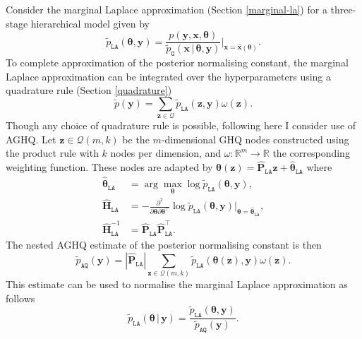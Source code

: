 \documentclass[a4paper, nobind]{templates/ociamthesis}
\begin{document}
Consider the marginal Laplace approximation (Section \ref{marginal-la}) for a three-stage hierarchical model given by
\begin{equation}
\tilde p_{\texttt{LA}}(\boldsymbol{\mathbf{\theta}}, \mathbf{y}) = \frac{p(\mathbf{y}, \mathbf{x}, \boldsymbol{\mathbf{\theta}})}{\tilde p_\texttt{G}(\mathbf{x} \, | \, \boldsymbol{\mathbf{\theta}}, \mathbf{y})} \Big\rvert_{\mathbf{x} = \hat{\mathbf{x}}(\boldsymbol{\mathbf{\theta}})}.
\end{equation}
To complete approximation of the posterior normalising constant, the marginal Laplace approximation can be integrated over the hyperparameters using a quadrature rule (Section \ref{quadrature})
\begin{equation}
\tilde p(\mathbf{y}) = \sum_{\mathbf{z} \in \mathcal{Q}} \tilde p_\texttt{LA}(\mathbf{z}, \mathbf{y}) \omega(\mathbf{z}). \label{eq:inlanormconst}
\end{equation}
Though any choice of quadrature rule is possible, following \textcite{stringer2022fast} here I consider use of AGHQ.
Let \(\mathbf{z} \in \mathcal{Q}(m, k)\) be the \(m\)-dimensional GHQ nodes constructed using the product rule with \(k\) nodes per dimension, and \(\omega: \mathbb{R}^m \to \mathbb{R}\) the corresponding weighting function.
These nodes are adapted by \(\boldsymbol{\mathbf{\theta}}(\mathbf{z}) = \hat{\mathbf{P}}_\texttt{LA} \mathbf{z} + \hat{\boldsymbol{\mathbf{\theta}}}_\texttt{LA}\) where
\begin{align}
\hat{\boldsymbol{\mathbf{\theta}}}_\texttt{LA} &= \arg\max_{\boldsymbol{\mathbf{\theta}}} \log \tilde p_{\texttt{LA}}(\boldsymbol{\mathbf{\theta}}, \mathbf{y}), \\
\hat{\boldsymbol{\mathbf{H}}}_\texttt{LA} &= - \frac{\partial^2}{\partial \boldsymbol{\mathbf{\theta}} \partial \boldsymbol{\mathbf{\theta}}^\top} \log \tilde p_{\texttt{LA}}(\boldsymbol{\mathbf{\theta}}, \mathbf{y}) \rvert_{\boldsymbol{\mathbf{\theta}} = \hat{\boldsymbol{\mathbf{\theta}}}_\texttt{LA}}, \\
\hat{\boldsymbol{\mathbf{H}}}_\texttt{LA}^{-1} &= \hat{\mathbf{P}}_\texttt{LA} \hat{\mathbf{P}}_\texttt{LA}^\top.
\end{align}
The nested AGHQ estimate of the posterior normalising constant is then
\begin{equation}
\tilde p_{\texttt{AQ}}(\mathbf{y}) = | \hat{\mathbf{P}}_\texttt{LA} | \sum_{\mathbf{z} \in \mathcal{Q}(m, k)} \tilde p_\texttt{LA}(\boldsymbol{\mathbf{\theta}}(\mathbf{z}), \mathbf{y}) \omega(\mathbf{z}). \label{eq:aghqnormconst}
\end{equation}
This estimate can be used to normalise the marginal Laplace approximation as follows
\begin{equation}
\tilde p_{\texttt{LA}}(\boldsymbol{\mathbf{\theta}} \, | \, \mathbf{y}) = \frac{\tilde p_{\texttt{LA}}(\boldsymbol{\mathbf{\theta}}, \mathbf{y})}{\tilde p_{\texttt{AQ}}(\mathbf{y})}.
\end{equation}
\end{document}
